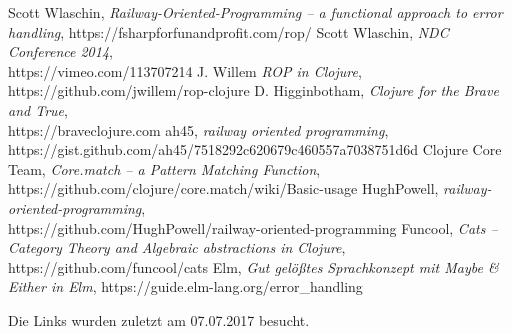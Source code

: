 \documentclass[10pt,journal,compsoc]{IEEEtran}
\begin{document}
  \begin{thebibliography}{1}
      Scott Wlaschin, \emph{Railway-Oriented-Programming -- a functional approach to error handling}, https://fsharpforfunandprofit.com/rop/
      Scott Wlaschin, \emph{NDC Conference 2014},\\https://vimeo.com/113707214
    J. Willem \emph{ROP in Clojure},\\https://github.com/jwillem/rop-clojure
    D. Higginbotham, \emph{Clojure for the Brave and True},\\https://braveclojure.com
      ah45, \emph{railway oriented programming},\\https://gist.github.com/ah45/7518292c620679c460557a7038751d6d
      Clojure Core Team, \emph{Core.match -- a Pattern Matching Function}, https://github.com/clojure/core.match/wiki/Basic-usage
    HughPowell, \emph{railway-oriented-programming},\\
    https://github.com/HughPowell/railway-oriented-programming
      Funcool, \emph{Cats -- Category Theory and Algebraic abstractions in Clojure}, https://github.com/funcool/cats
      Elm, \emph{Gut gelößtes Sprachkonzept mit Maybe \& Either in Elm}, https://guide.elm-lang.org/error\_handling
  \end{thebibliography}
  Die Links wurden zuletzt am 07.07.2017 besucht.
\end{document}
